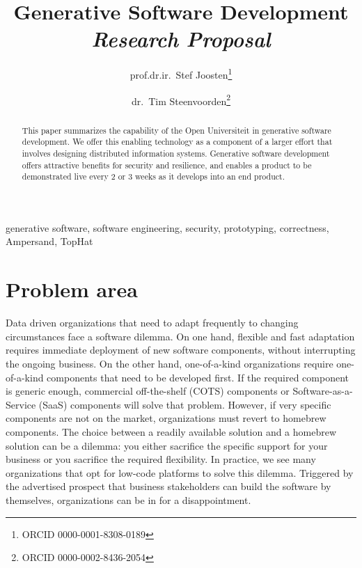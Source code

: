 \documentclass{elsarticle}
\begin{document}
% 

\title{Generative Software Development\\{\em\normalsize Research Proposal}}
\author{prof.dr.ir.\ Stef Joosten\footnote{ORCID 0000-0001-8308-0189}}
\author{dr.\ Tim Steenvoorden\footnote{ORCID 0000-0002-8436-2054}}
\address{Open Universiteit Nederland, Heerlen, the Netherlands}

\begin{abstract}
    This paper summarizes the capability of the Open Universiteit in generative software development.
    We offer this enabling technology as a component of a larger effort that involves designing distributed information systems.
    Generative software development offers attractive benefits for security and resilience,
    and enables a product to be demonstrated live every 2 or 3 weeks as it develops into an end product.
\end{abstract}

\begin{keyword}
    generative software, software engineering, security, prototyping, correctness, Ampersand, TopHat
\end{keyword}
\maketitle

\section{Problem area}
   Data driven organizations that need to adapt frequently to changing circumstances face a software dilemma.
   On one hand, flexible and fast adaptation requires immediate deployment of new software components, without interrupting the ongoing business.
   On the other hand, one-of-a-kind organizations require one-of-a-kind components that need to be developed first.
   If the required component is generic enough, commercial off-the-shelf (COTS) components or Software-as-a-Service (SaaS) components will solve that problem.
   However, if very specific components are not on the market, organizations must revert to homebrew components.
   The choice between a readily available solution and a homebrew solution can be a dilemma:
   you either sacrifice the specific support for your business or you sacrifice the required flexibility.
   In practice, we see many organizations that opt for low-code platforms to solve this dilemma.
   Triggered by the advertised prospect that business stakeholders can build the software by themselves,
   organizations can be in for a disappointment.
\end{document}
